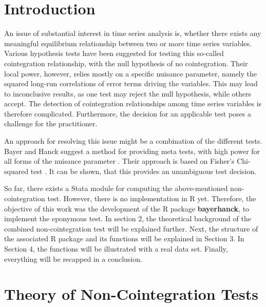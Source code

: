 \documentclass[11pt,a4paper]{article}
\begin{document}
\restoregeometry


{
\hypersetup{linkcolor=black}
\setcounter{tocdepth}{3}
\tableofcontents
}
\newpage
\listoftables
\newpage
\listoffigures
\newpage
{} 
\hypertarget{introduction}{%
\section{Introduction}\label{introduction}}

An issue of substantial interest in time series analysis is, whether
there exists any meaningful equilibrium relationship between two or more
time series variables. Various hypothesis tests have been suggested for
testing this so-called cointegration relationship, with the null
hypothesis of no cointegration. Their local power, however, relies
mostly on a specific nuisance parameter, namely the squared long-run
correlations of error terms driving the variables. This may lead to
inconclusive results, as one test may reject the null hypothesis, while
others accept. The detection of cointegration relationships among time
series variables is therefore complicated. Furthermore, the decision for
an applicable test poses a challenge for the practitioner.

An approach for resolving this issue might be a combination of the
different tests. Bayer and Hanck suggest a method for providing meta
tests, with high power for all forms of the nuisance parameter
\autocite{Bayerhanck2009}. Their approach is based on Fisher's
Chi-squared test \autocite{Fisher1925}. It can be shown, that this
provides an unambiguous test decision.

So far, there exists a Stata module for computing the above-mentioned
non-cointegration test. However, there is no implementation in R yet.
Therefore, the objective of this work was the development of the R
package \textbf{bayerhanck}, to implement the eponymous test. In section
2, the theoretical background of the combined non-cointegration test
will be explained further. Next, the structure of the associated R
package and its functions will be explained in Section 3. In Section 4,
the functions will be illustrated with a real data set. Finally,
everything will be recapped in a conclusion.

\hypertarget{theory-of-non-cointegration-tests}{%
\section{Theory of Non-Cointegration
Tests}\label{theory-of-non-cointegration-tests}}
\end{document}
